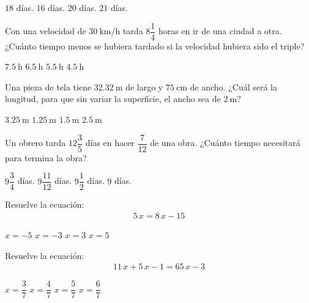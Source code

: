 \documentclass[12pt, letter]{exam}
\begin{document}
\begin{multicols}{2}
\begin{questions}
     \begin{choices}
        \choice $18$ días.
        \choice $16$ días.
        \choice $20$ días.
        \choice $21$ días.
    \end{choices}
    \question Con una velocidad de $\SI[per-mode=symbol]{30}{\kilo\meter\per\hour}$ tarda $8 \dfrac{1}{4}$ horas en ir de una ciudad a otra. ¿Cuánto tiempo menos se hubiera tardado si la velocidad hubiera sido el triple?
     \begin{choices}
        \choice $\SI{7.5}{\hour}$ 
        \choice $\SI{6.5}{\hour}$ 
        \choice $\SI{5.5}{\hour}$ 
        \choice $\SI{4.5}{\hour}$
    \end{choices}
    \question Una pieza de tela tiene $\SI{32.32}{\meter}$ de largo y $\SI{75}{\centi\meter}$ de ancho. ¿Cuál será la longitud, para que sin variar la superficie, el ancho sea de $\SI{2}{\meter}$?
     \begin{choices}
        \choice $\SI{3.25}{\meter}$ 
        \choice $\SI{1.25}{\meter}$ 
        \choice $\SI{1.5}{\meter}$ 
        \choice $\SI{2.5}{\meter}$
    \end{choices}
    \newpage
    \question Un obrero tarda $12 \dfrac{3}{5}$ días en hacer $\dfrac{7}{12}$ de una obra. ¿Cuánto tiempo necesitará para termina la obra?
     \begin{choices}
        \choice $9 \dfrac{3}{4}$ días. 
        \choice $9 \dfrac{11}{12}$ días. 
        \choice $9 \dfrac{1}{2}$ días. 
        \choice $9$ días.
    \end{choices}
    \question Resuelve la ecuación:
    \begingroup
    \abovedisplayskip=0pt
    \belowdisplayskip=-10pt
    \begin{align*}
    5 \, x = 8 \, x - 15
    \end{align*}
    \endgroup
    \begin{choices}
        \choice $x = -5$
        \choice $x = -3$
        \choice $x = 3$
        \choice $x = 5$
    \end{choices}
    \question Resuelve la ecuación:
    \begingroup
    \abovedisplayskip=0pt
    \belowdisplayskip=-10pt
    \begin{align*}
    11 \, x + 5 \, x - 1 = 65 \, x - 3
    \end{align*}
    \endgroup
    \begin{choices}
        \choice $x = \dfrac{3}{7}$
        \choice $x = \dfrac{4}{7}$
        \choice $x = \dfrac{5}{7}$
        \choice $x = \dfrac{6}{7}$

\end{choices}
\end{questions}
\end{multicols}
\end{document}
